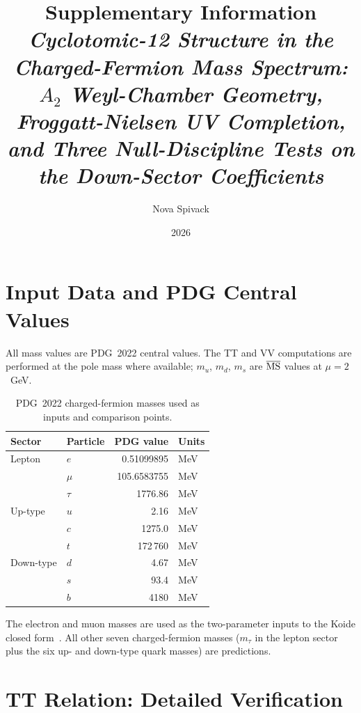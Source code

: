 \documentclass[11pt]{article}
\title{\bfseries Supplementary Information\\[0.3em]
\normalsize\normalfont
\textit{Cyclotomic-12 Structure in the Charged-Fermion Mass Spectrum:
$A_2$ Weyl-Chamber Geometry, Froggatt-Nielsen UV Completion,
and Three Null-Discipline Tests on the Down-Sector Coefficients}}
\author[1]{Nova Spivack}
\affil[1]{Independent Research}
\date{2026}
\theoremstyle{remark}
\begin{document}
\maketitle
\tableofcontents
\newpage

\section{Input Data and PDG Central Values}
\label{sec:si_pdg}

All mass values are PDG~2022 central values.  The TT and VV computations
are performed at the pole mass where available; $m_u$, $m_d$, $m_s$ are
$\overline{\rm MS}$ values at $\mu=2$~GeV.

\begin{table}[ht]
\centering
\caption{PDG~2022 charged-fermion masses used as inputs and comparison points.}
\label{tab:si_pdg}
\begin{tabular}{llrl}
\toprule
Sector & Particle & PDG value & Units \\
\midrule
Lepton & $e$ & 0.51099895 & MeV \\
       & $\mu$ & 105.6583755 & MeV \\
       & $\tau$ & 1776.86 & MeV \\
\midrule
Up-type & $u$ & 2.16 & MeV \\
        & $c$ & 1275.0 & MeV \\
        & $t$ & 172\,760 & MeV \\
\midrule
Down-type & $d$ & 4.67 & MeV \\
          & $s$ & 93.4 & MeV \\
          & $b$ & 4180 & MeV \\
\bottomrule
\end{tabular}
\end{table}

\noindent The electron and muon masses are used as the two-parameter inputs
to the Koide closed form~\cite{Spivack2026_Koide}.  All other seven
charged-fermion masses ($m_\tau$ in the lepton sector plus the six up- and
down-type quark masses) are predictions.

\section{TT Relation: Detailed Verification}
\label{sec:si_tt}
\end{document}
